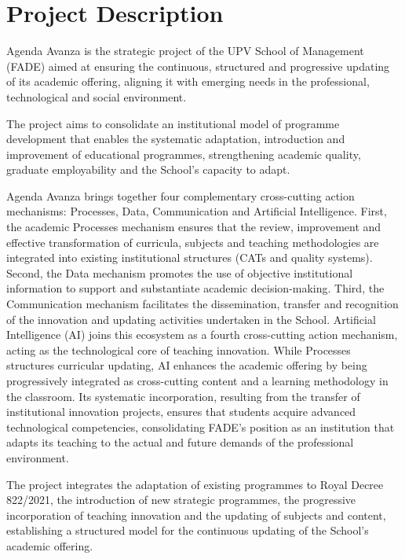 \documentclass[11pt,a4paper]{scrreprt}
\begin{document}
\section{Project Description}

\small
Agenda Avanza is the strategic project of the UPV School of Management (FADE) aimed at ensuring the continuous, structured and progressive updating of its academic offering, aligning it with emerging needs in the professional, technological and social environment.

The project aims to consolidate an institutional model of programme development that enables the systematic adaptation, introduction and improvement of educational programmes, strengthening academic quality, graduate employability and the School's capacity to adapt.

Agenda Avanza brings together four complementary cross-cutting action mechanisms: Processes, Data, Communication and Artificial Intelligence. First, the academic Processes mechanism ensures that the review, improvement and effective transformation of curricula, subjects and teaching methodologies are integrated into existing institutional structures (CATs and quality systems). Second, the Data mechanism promotes the use of objective institutional information to support and substantiate academic decision-making. Third, the Communication mechanism facilitates the dissemination, transfer and recognition of the innovation and updating activities undertaken in the School. Artificial Intelligence (AI) joins this ecosystem as a fourth cross-cutting action mechanism, acting as the technological core of teaching innovation. While Processes structures curricular updating, AI enhances the academic offering by being progressively integrated as cross-cutting content and a learning methodology in the classroom. Its systematic incorporation, resulting from the transfer of institutional innovation projects, ensures that students acquire advanced technological competencies, consolidating FADE's position as an institution that adapts its teaching to the actual and future demands of the professional environment.

The project integrates the adaptation of existing programmes to Royal Decree 822/2021, the introduction of new strategic programmes, the progressive incorporation of teaching innovation and the updating of subjects and content, establishing a structured model for the continuous updating of the School's academic offering.
\end{document}
